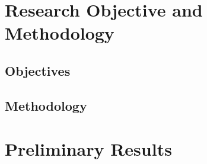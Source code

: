 \documentclass[a4paper,12pt]{article}
\begin{document}
\section{Research Objective and Methodology}
\subsection{Objectives}
    \label{sec_objectives}

\subsection{Methodology}
    \label{sec_methodology}

\clearpage

\section{Preliminary Results}
\clearpage


\end{document}
